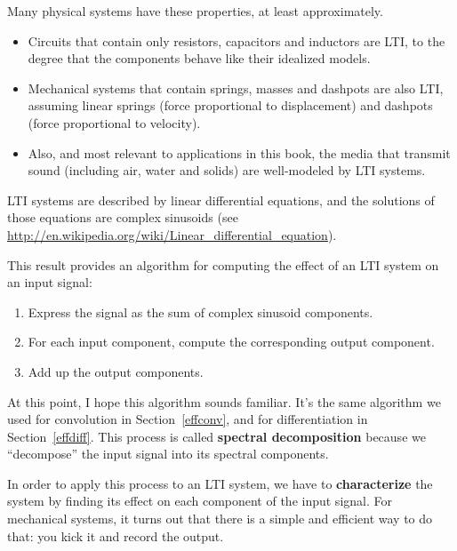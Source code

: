 Many physical systems have these properties, at least approximately.

\begin{itemize}
	
	\item Circuits that contain only resistors, capacitors and inductors are
	LTI, to the degree that the components behave like their idealized
	models.
	
	\item Mechanical systems that contain springs, masses and
	dashpots are also LTI, assuming linear springs (force proportional
	to displacement) and dashpots (force proportional to velocity).
	
	\item Also, and most relevant to applications in this book,
	the media that transmit sound (including air, water
	and solids) are well-modeled by LTI systems.
	
\end{itemize}

LTI systems are described by linear differential equations, and
the solutions of those equations are complex sinusoids (see
\url{http://en.wikipedia.org/wiki/Linear_differential_equation}).

This result provides an algorithm for computing the effect of
an LTI system on an input signal:

\begin{enumerate}
	
	\item Express the signal as the sum of complex sinusoid components.
	
	\item For each input component, compute the corresponding output component.
	
	\item Add up the output components.
	
\end{enumerate}

At this point, I hope this algorithm sounds familiar.  It's the
same algorithm we used for convolution in Section~\ref{effconv}, and
for differentiation in Section~\ref{effdiff}.  This process
is called {\bf spectral decomposition} because we ``decompose''
the input signal into its spectral components.

In order to apply this process to an LTI system, we have to {\bf
	characterize} the system by finding its effect on each component
of the input signal.  For mechanical systems, it turns out that there
is a simple and efficient way to do that: you kick it and record
the output.

